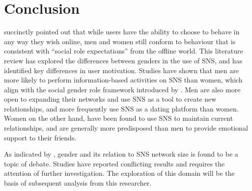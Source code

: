 \section{Conclusion}

\citet[p. 897]{Kimbrough2013} succinctly pointed out that while users have the ability to choose to behave in any way they wish online, men and women still conform to behaviour that is consistent with ``social role expectations'' from the offline world. This literature review has explored the differences between genders in the use of SNS, and has identified key differences in user motivation. Studies have shown that men are more likely to perform information-based activities on SNS than women, which align with the social gender role framework introduced by \citet{Eagly1987}. Men are also more open to expanding their networks and use SNS as a tool to create new relationships, and more frequently use SNS as a dating platform than women. Women on the other hand, have been found to use SNS to maintain current relationships, and are generally more predisposed than men to provide emotional support to their friends. %

As indicated by \citet{Tifferet2014}, gender and its relation to SNS network size is found to be a topic of debate. Studies have reported conflicting results and requires the attention of further investigation. The exploration of this domain will be the basis of subsequent analysis from this researcher.

